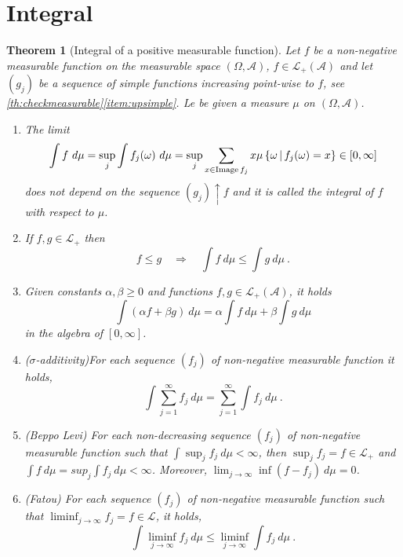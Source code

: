 \documentclass[12pt,a4paper]{amsart}
\theoremstyle{plain}
\newtheorem{theorem}{Theorem}%
\theoremstyle{definition}
\theoremstyle{remark}
\begin{document}
\section{Integral}
\label{sec:integrals}

\begin{theorem}[Integral of a positive measurable function]
Let $f$ be a non-negative measurable function on the measurable space
$(\Omega,\mathcal A)$, $f \in \mathcal L_+(\mathcal A)$ and let $(g_j)$ be a sequence of simple
functions increasing point-wise to $f$, see
\cref{th:checkmeasurable}\eqref{item:upsimple}. Le be given a measure $\mu$
on $(\Omega,\mathcal A)$.
\begin{enumerate}
\item The limit
  \begin{equation*}
    \int f \ d\mu = \sup_j \int f_j(\omega) \ d\mu = \sup_j \sum_{x \in
      \operatorname{Image} f_j} x \mu\left\{\omega \, \middle| \, f_j(\omega) = x \right\}
    \in [0,\infty]  
  \end{equation*}
  does not depend on the sequence $(g_j) \uparrow f$ and it is called the
  \emph{integral of $f$ with respect to $\mu$}.
\item If $f, g \in \mathcal L_+$ then
  \begin{equation*}
    f \leq g \quad \Rightarrow \quad \int f \ d\mu \leq \int g \ d\mu \ .
  \end{equation*}
\item Given constants $\alpha,\beta \geq 0$ and functions $f,g \in
  \mathcal L_+(\mathcal A)$, it holds
  \begin{equation*}
    \int (\alpha f + \beta g) \ d\mu = \alpha \int f \ d\mu + \beta
    \int g \ d\mu
  \end{equation*}
in the algebra of $[0,\infty]$. 
\item (\emph{$\sigma$-additivity})For each sequence $(f_j)$ of non-negative measurable function
  it holds,
  \begin{equation*}
    \int \sum_{j=1}^\infty f_j \ d\mu = \sum_{j=1}^\infty  \int f_j \ d\mu \ .
  \end{equation*}
\item (\emph{Beppo Levi}) For each non-decreasing sequence $(f_j)$ of non-negative measurable function
  such that $\int \sup_{j} f_j \ d\mu < \infty$, then $\sup_j f_j = f
  \in \mathcal L_+$ and $\int f \ d\mu = sup_j \int f_j \ d\mu <
  \infty$. Moreover, $\lim_{j \to \infty} \inf (f - f_j) \ d\mu = 0$.  
\item (\emph{Fatou}) For each sequence $(f_j)$ of non-negative measurable function
  such that $\liminf_{j\to\infty} f_j = f \in \mathcal L$, it  holds,
  \begin{equation*}
    \int \liminf_{j \to \infty} f_j \ d\mu \leq \liminf_{j \to \infty}
    \int f_j \ d\mu \ .
  \end{equation*}
\end{enumerate}
\end{theorem}
\end{document}
